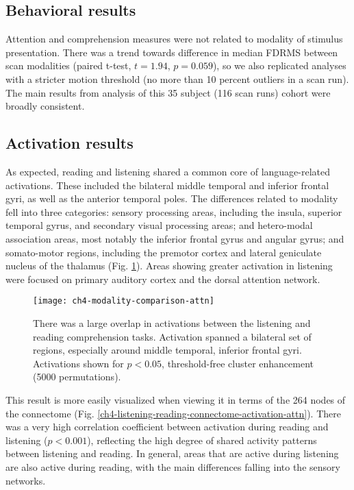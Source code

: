 \subsection{Behavioral results}

Attention and comprehension measures were not related to modality of stimulus presentation. There was a trend towards difference in median FDRMS between scan modalities (paired t-test, $t = 1.94$, $p = 0.059$), so we also replicated analyses with a stricter motion threshold (no more than 10 percent outliers in a scan run). The main results from analysis of this 35 subject (116 scan runs) cohort were broadly consistent.

\subsection{Activation results}

As expected, reading and listening shared a common core of language-related activations. These included the bilateral middle temporal and inferior frontal gyri, as well as the  anterior temporal poles. The differences related to modality fell into three categories: sensory processing areas, including the insula, superior temporal gyrus, and secondary visual processing areas; and hetero-modal association areas, most notably the inferior frontal gyrus and angular gyrus; and somato-motor regions, including the premotor cortex and lateral geniculate nucleus of the thalamus (Fig. \ref{fig:ch4-modality-comparison-attn}). Areas showing greater activation in listening were focused on primary auditory cortex and the dorsal attention network.

\begin{figure}[t]
	\centering
	\texttt{[image: ch4-modality-comparison-attn]}
    \caption[Large overlap between listening and reading activation.]{There was a large overlap in activations between the listening and reading comprehension tasks. Activation spanned a bilateral set of regions, especially around middle temporal, inferior frontal gyri. Activations shown for $p < 0.05$, threshold-free cluster enhancement (5000 permutations).}
	\label{fig:ch4-modality-comparison-attn}
\end{figure}

This result is more easily visualized when viewing it in terms of the 264 nodes of the connectome (Fig. \ref{ch4-listening-reading-connectome-activation-attn}). There was a very high correlation coefficient between activation during reading and listening ($p < 0.001$), reflecting the high degree of shared activity patterns between listening and reading. In general, areas that are active during listening are also active during reading, with the main differences falling into the sensory networks. 

